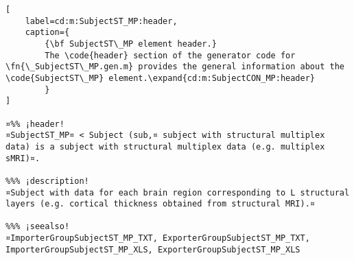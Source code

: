 \documentclass{tufte-handout}
\begin{document}
\begin{lstlisting}[
	label=cd:m:SubjectST_MP:header,
	caption={
		{\bf SubjectST\_MP element header.}
		The \code{header} section of the generator code for \fn{\_SubjectST\_MP.gen.m} provides the general information about the \code{SubjectST\_MP} element.\expand{cd:m:SubjectCON_MP:header}
		}
]

¤%% ¡header!
¤SubjectST_MP¤ < Subject (sub,¤ subject with structural multiplex data) is a subject with structural multiplex data (e.g. multiplex sMRI)¤.

%%% ¡description!
¤Subject with data for each brain region corresponding to L structural layers (e.g. cortical thickness obtained from structural MRI).¤

%%% ¡seealso!
¤ImporterGroupSubjectST_MP_TXT, ExporterGroupSubjectST_MP_TXT, ImporterGroupSubjectST_MP_XLS, ExporterGroupSubjectST_MP_XLS
\end{lstlisting}
\end{document}
